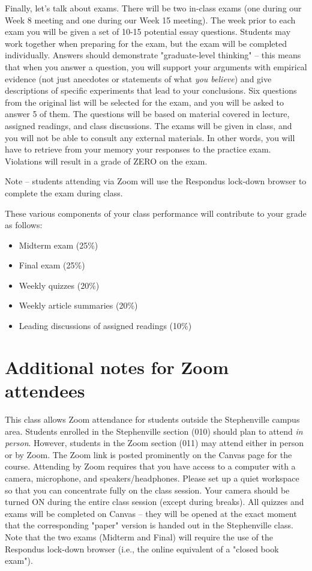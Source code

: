 \documentclass[10pt]{article}
\begin{document}
Finally, let's talk about exams. There will be two in-class exams (one during our Week 8 meeting and one during our Week 15 meeting).  The week prior to each exam you will be given a set of 10-15 potential essay questions. Students may work together when preparing for the exam, but the exam will be completed individually. Answers should demonstrate "graduate-level thinking" -- this means that when you answer a question, you will support your arguments with empirical evidence (not just anecdotes or statements of what \emph{you believe}) and give descriptions of specific experiments that lead to your conclusions. Six questions from the original list will be selected for the exam, and you will be asked to answer 5 of them. The questions will be based on material covered in lecture, assigned readings, and class discussions. The exams will be given in class, and you will not be able to consult any external materials.  In other words, you will have to retrieve from your memory your responses to the practice exam.  Violations will result in a grade of ZERO on the exam.

Note -- students attending via Zoom will use the Respondus lock-down browser to complete the exam during class.

These various components of your class performance will contribute to your grade as follows:

\begin{itemize}
\item Midterm exam (25\%)
\item Final exam (25\%)
\item Weekly quizzes (20\%)
\item Weekly article summaries (20\%)
\item Leading discussions of assigned readings (10\%)
\end{itemize}

\section*{Additional notes for Zoom attendees}
\label{sec:org35f138a}

This class allows Zoom attendance for students outside the Stephenville campus area. Students enrolled in the Stephenville section (010) should plan to attend \emph{in person}. However, students in the Zoom section (011) may attend either in person or by Zoom. The Zoom link is posted prominently on the Canvas page for the course. Attending by Zoom requires that you have access to a computer with a camera, microphone, and speakers/headphones. Please set up a quiet workspace so that you can concentrate fully on the class session. Your camera should be turned ON during the entire class session (except during breaks). All quizzes and exams will be completed on Canvas -- they will be opened at the exact moment that the corresponding "paper" version is handed out in the Stephenville class. Note that the two exams (Midterm and Final) will require the use of the Respondus lock-down browser (i.e., the online equivalent of a "closed book exam").
\end{document}
